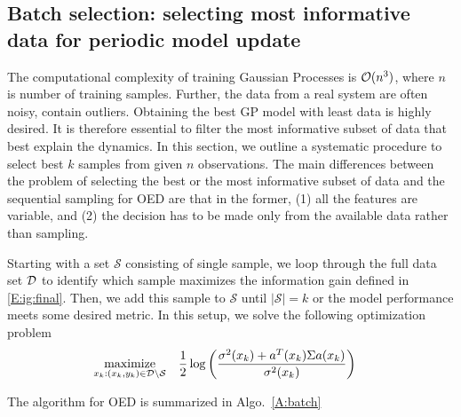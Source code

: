 \begin{figure}[!tb]
	\centering
	\caption{}
	\captionsetup{justification=centering}
	\label{F:OED}
\end{figure}


\subsection{Batch selection: selecting most informative data for periodic model update}

The computational complexity of training Gaussian Processes is $\mathcal{O}(n^3)$, where $n$ is number of training samples. 
Further, the data from a real system are often noisy, contain outliers. 
Obtaining the best GP model with least data is highly desired.
It is therefore essential to filter the most informative subset of data that best explain the dynamics.
In this section, we outline a systematic procedure to select best $k$ samples from given $n$ observations.
The main differences between the problem of selecting the best or the most informative subset of data and the sequential sampling for OED are that in the former, (1) all the features are variable, and (2) the decision has to be made only from the available data rather than sampling. 

Starting with a set \(\mathcal{S}\) consisting of single sample, we loop through the full data set \(\mathcal{D}\) to identify which sample maximizes the information gain defined in \eqref{E:ig:final}. Then, we add this sample to \(\mathcal{S}\) until \(|\mathcal{S}|=k\) or the model performance meets some desired metric. In this setup, we solve the following optimization problem
\begin{align}
\operatorname*{maximize}_{x_{k}:(x_k,y_k) \in \mathcal{D} \setminus \mathcal{S}} & \ \ \ \frac{1}{2}\log\left(\frac{\sigma^2(x_k)+a^T(x_k)\Sigma a(x_k)}{\sigma^2(x_k)}\right)
\end{align}

The algorithm for OED is summarized in Algo.~\ref{A:batch}

\begin{figure}[!tb]
	\centering
	\setlength{}
	\setlength{}	
	
	\caption{}
	\captionsetup{justification=centering}
	\label{F:OED-acc}
\end{figure}
